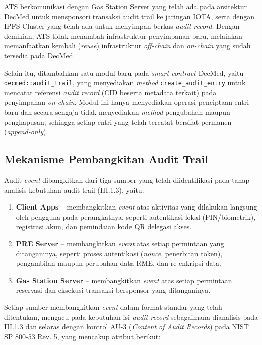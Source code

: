 ATS berkomunikasi dengan Gas Station Server yang telah ada pada arsitektur
DecMed untuk mensponsori transaksi audit trail ke jaringan IOTA, serta dengan
IPFS Cluster yang telah ada untuk menyimpan berkas \textit{audit record}.
Dengan demikian, ATS tidak menambah infrastruktur penyimpanan baru, melainkan
memanfaatkan kembali (\textit{reuse}) infrastruktur \textit{off-chain} dan
\textit{on-chain} yang sudah tersedia pada DecMed.

Selain itu, ditambahkan satu modul baru pada \textit{smart contract} DecMed,
yaitu \texttt{decmed::audit\_trail}, yang menyediakan \textit{method}
\texttt{create\_audit\_entry} untuk mencatat referensi \textit{audit record}
(CID beserta metadata terkait) pada penyimpanan \textit{on-chain}. Modul ini
hanya menyediakan operasi penciptaan entri baru dan secara sengaja tidak
menyediakan \textit{method} pengubahan maupun penghapusan, sehingga setiap
entri yang telah tercatat bersifat permanen (\textit{append-only}).

\subsection{Mekanisme Pembangkitan Audit Trail}

Audit \textit{event} dibangkitkan dari tiga sumber yang telah diidentifikasi
pada tahap analisis kebutuhan audit trail (III.1.3), yaitu:

\begin{enumerate}
    \item \textbf{Client Apps} -- membangkitkan \textit{event} atas aktivitas
    yang dilakukan langsung oleh pengguna pada perangkatnya, seperti
    autentikasi lokal (PIN/biometrik), registrasi akun, dan pemindaian kode QR
    delegasi akses.
    \item \textbf{PRE Server} -- membangkitkan \textit{event} atas setiap
    permintaan yang ditanganinya, seperti proses autentikasi (\textit{nonce},
    penerbitan token), pengambilan maupun perubahan data RME, dan re-enkripsi
    data.
    \item \textbf{Gas Station Server} -- membangkitkan \textit{event} atas
    setiap permintaan reservasi dan eksekusi transaksi bersponsor yang
    ditanganinya.
\end{enumerate}

Setiap sumber membangkitkan \textit{event} dalam format standar yang telah
ditentukan, mengacu pada kebutuhan isi \textit{audit record} sebagaimana
dianalisis pada III.1.3 dan selaras dengan kontrol AU-3 (\textit{Content of
Audit Records}) pada NIST SP 800-53 Rev. 5, yang mencakup atribut berikut:

